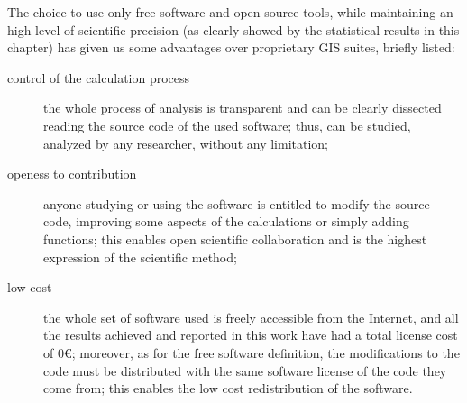                 The choice to use only free software and open source tools, while maintaining an high level of scientific precision (as clearly showed by the statistical results in this chapter) has given us some advantages over proprietary GIS suites, briefly listed:
                \begin{description}
                    \item[control of the calculation process] the whole process of analysis is transparent and can be clearly dissected reading the source code of the used software; thus, can be studied, analyzed by any researcher, without any limitation;
                    \item[openess to contribution] anyone studying or using the software is entitled to modify the source code, improving some aspects of the calculations or simply adding functions; this enables open scientific collaboration and is the highest expression of the scientific method;
                    \item[low cost] the whole set of software used is freely accessible from the Internet, and all the results achieved and reported in this work have had a total license cost of $0\euro$; moreover, as for the free software definition, the modifications to the code must be distributed with the same software license of the code they come from; this enables the low cost redistribution of the software.
                \end{description}
